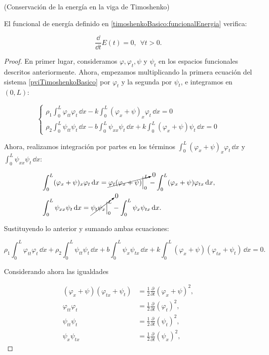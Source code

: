 \begin{Proposicion}{(Conservación de la energía en la viga de Timoshenko)}
    \label{ch:teoriaVigas:prop:ConservacionEnergiaTimoshenkoBasico}

    El funcional de energía definido en \eqref{timoshenkoBasico:funcionalEnergia} verifica:

    \[\frac{\dd}{\dd t}E(t) = 0, \ \ \forall t > 0.\]
\end{Proposicion}

\begin{proof}
    En primer lugar, consideramos $\varphi, \varphi_t, \psi$ y $\psi_t$ en los espacios funcionales descritos anteriormente. Ahora, empezamos multiplicando la primera ecuación del sistema \eqref{pviTimoshenkoBasico} por $\varphi_t$ y la segunda por $\psi_t$, e integramos en $(0,L)$:

    \begin{equation*}
    \begin{cases}
    \displaystyle \rho_1 \int_0^L \varphi_{tt} \varphi_t \, \dd x - k \int_0^L (\varphi_x + \psi)_x \varphi_t \, \dd x = 0\\
    \displaystyle \rho_2 \int_0^L \psi_{tt} \psi_t \, \dd x - b\int_0^L \psi_{xx}\psi_t \, \dd x + k \int_0^L (\varphi_x + \psi) \psi_t \, \dd x = 0
    \end{cases}
    \end{equation*}

    Ahora, realizamos integración por partes en los términos $\int_0^L (\varphi_x + \psi)_x \varphi_t \, \dd x$ y $\int_0^L \psi_{xx}\psi_t \, \dd x$:

    \begin{align*}
        &\int_0^L (\varphi_x + \psi)_x \varphi_t \, \mathrm{d} x = \cancelto{0}{\varphi_t(\varphi_x + \psi)\Big|_0^L} - \int_0^L(\varphi_x + \psi) \varphi_{tx} \, \mathrm{d} x,\\
        &\int_0^L \psi_{xx}\psi_t \, \mathrm{d} x = \cancelto{0}{\psi_t \psi_x\Big|_0^L} - \int_0^L \psi_x \psi_{tx} \, \mathrm{d} x.
    \end{align*}

    Sustituyendo lo anterior y sumando ambas ecuaciones:

    \[\rho_1 \int_0^L\varphi_{tt}\varphi_t \, \dd x + \rho_2 \int_0^L \psi_{tt}\psi_t \, \dd x + b\int_0^L \psi_x \psi_{tx} \, \dd x + k \int_0^L (\varphi_x + \psi)(\varphi_{tx} + \psi_t) \, \dd x = 0.\]

    Considerando ahora las igualdades

    \begin{align*}
        (\varphi_x + \psi)(\varphi_{tx} + \psi_t) &= \frac{1}{2}\frac{\partial}{\partial t}(\varphi_x + \psi)^2,\\
        \varphi_{tt}\varphi_t &= \frac{1}{2}\frac{\partial}{\partial t}(\varphi_t)^2,\\
        \psi_{tt}\psi_t &= \frac{1}{2}\frac{\partial}{\partial t}(\psi_t)^2,\\
        \psi_x \psi_{tx} &= \frac{1}{2}\frac{\partial}{\partial t}(\psi_x)^2,
    \end{align*}


\end{proof}

